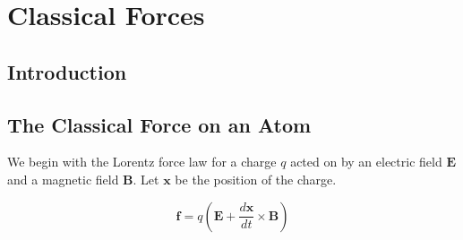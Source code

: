 \chapter{Classical Forces}



\section{Introduction}




\newpage
\section{The Classical Force on an Atom}


We begin with the Lorentz force law for a charge $q$ acted on by an electric field $\mathbf{E}$ and a magnetic field $\mathbf{B}$. Let $\mathbf{x}$ be the position of the charge.

\begin{equation}
\mathbf{f}=q\left(\mathbf{E}+\frac{d\mathbf{x}}{dt}\times\mathbf{B}\right)
\label{lorentz}
\end{equation}

